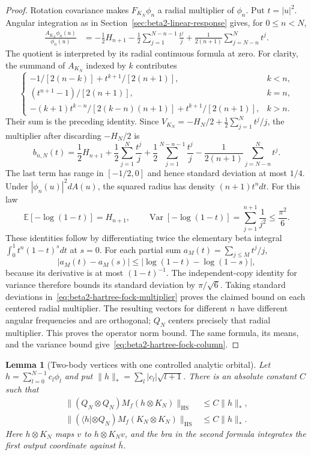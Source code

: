\documentclass[11pt,a4paper]{article}
\numberwithin{equation}{section}
\newtheorem{lemma}[theorem]{Lemma}
\theoremstyle{definition}
\theoremstyle{remark}
\newcommand{\E}{\mathbb E}
\DeclareMathOperator{\Var}{Var}
\begin{document}
\begin{proof}
Rotation covariance makes $F_{K_N}\phi_n$ a radial multiplier of
$\phi_n$.  Put $t=|u|^2$.  Angular integration as in
Section~\ref{sec:beta2-linear-response} gives, for $0\le n<N$,
\begin{align*}
 \frac{A_{K_N}\phi_n(u)}{\phi_n(u)}
 &=-\frac12H_{n+1}
   -\frac12\sum_{j=1}^{N-n-1}\frac{t^j}{j}
   +\frac1{2(n+1)}\sum_{j=N-n}^N t^j.
\end{align*}
The quotient is interpreted by its radial continuous formula at zero.
For clarity, the summand of $A_{K_N}$ indexed by $k$ contributes
\[
 \begin{cases}
 -1/[2(n-k)]+t^{k+1}/[2(n+1)],&k<n,\\
 (t^{n+1}-1)/[2(n+1)],&k=n,\\
 -(k+1)t^{k-n}/[2(k-n)(n+1)]+t^{k+1}/[2(n+1)],&k>n.
 \end{cases}
\]
Their sum is the preceding identity.  Since
$V_{K_N}=-H_N/2+\tfrac12\sum_{j=1}^Nt^j/j$, the multiplier after
discarding $-H_N/2$ is
\begin{equation}
 b_{n,N}(t)=\frac12H_{n+1}
 +\frac12\sum_{j=1}^N\frac{t^j}{j}
 +\frac12\sum_{j=1}^{N-n-1}\frac{t^j}{j}
 -\frac1{2(n+1)}\sum_{j=N-n}^Nt^j.
 \label{eq:beta2-hartree-fock-multiplier}
\end{equation}
The last term has range in $[-1/2,0]$ and hence standard deviation
at most $1/4$.  Under $|\phi_n(u)|^2dA(u)$, the squared radius has
density $(n+1)t^n dt$.  For this law
\[
 \E[-\log(1-t)]=H_{n+1},\qquad
 \Var[-\log(1-t)]=\sum_{j=1}^{n+1}\frac1{j^2}\le\frac{\pi^2}{6}.
\]
These identities follow by differentiating twice the elementary
beta integral $\int_0^1t^n(1-t)^sdt$ at $s=0$.
For each partial sum $a_M(t)=\sum_{j\le M}t^j/j$,
\[
 |a_M(t)-a_M(s)|\le
 |\log(1-t)-\log(1-s)|,
\]
because its derivative is at most $(1-t)^{-1}$.
The independent-copy identity for variance therefore bounds its
standard deviation by $\pi/\sqrt6$.  Taking standard deviations
in~\eqref{eq:beta2-hartree-fock-multiplier} proves the claimed bound
on each centered radial multiplier.  The resulting vectors for
different $n$ have different angular frequencies and are orthogonal;
$Q_N$ centers precisely that radial multiplier.  This proves the
operator norm bound.  The same formula, its means, and the variance
bound give~\eqref{eq:beta2-hartree-fock-column}.
\end{proof}

\begin{lemma}[Two-body vertices with one controlled analytic orbital]
\label{lem:beta2-two-body-vertex}
Let $h=\sum_{l=0}^{N-1}c_l\phi_l$ and put
$\|h\|_* =\sum_l|c_l|\sqrt{l+1}$.  There is an absolute constant
$C$ such that
\begin{align}
 \|(Q_N\otimes Q_N)M_f(h\otimes K_N)\|_{\mathrm{HS}}
 &\le C\|h\|_*,\label{eq:beta2-loss-vertex}\\
 \|(\langle h|\otimes Q_N)M_f(K_N\otimes K_N)\|_{\mathrm{HS}}
 &\le C\|h\|_*.
 \label{eq:beta2-gain-vertex}
\end{align}
Here $h\otimes K_N$ maps $v$ to $h\otimes K_Nv$, and the bra in
the second formula integrates the first output coordinate against
$\bar h$.
\end{lemma}
\end{document}
